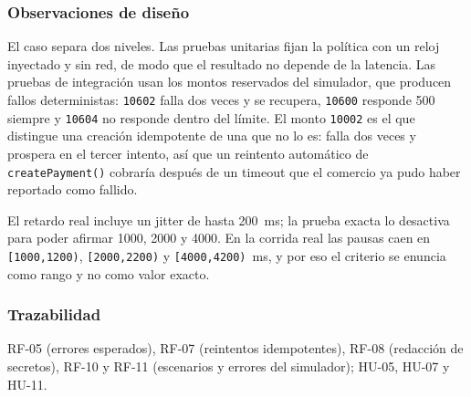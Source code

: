 \subsubsection{Observaciones de diseño}

El caso separa dos niveles. Las pruebas unitarias fijan la política con un reloj inyectado y sin red, de modo que el resultado no depende de la latencia. Las pruebas de integración usan los montos reservados del simulador, que producen fallos deterministas: \texttt{10602} falla dos veces y se recupera, \texttt{10600} responde 500 siempre y \texttt{10604} no responde dentro del límite. El monto \texttt{10002} es el que distingue una creación idempotente de una que no lo es: falla dos veces y prospera en el tercer intento, así que un reintento automático de \texttt{createPayment()} cobraría después de un timeout que el comercio ya pudo haber reportado como fallido.

El retardo real incluye un jitter de hasta 200~ms; la prueba exacta lo desactiva para poder afirmar 1000, 2000 y 4000. En la corrida real las pausas caen en \texttt{[1000,1200)}, \texttt{[2000,2200)} y \texttt{[4000,4200)}~ms, y por eso el criterio se enuncia como rango y no como valor exacto.

\subsubsection{Trazabilidad}

RF-05 (errores esperados), RF-07 (reintentos idempotentes), RF-08 (redacción de secretos), RF-10 y RF-11 (escenarios y errores del simulador); HU-05, HU-07 y HU-11.
